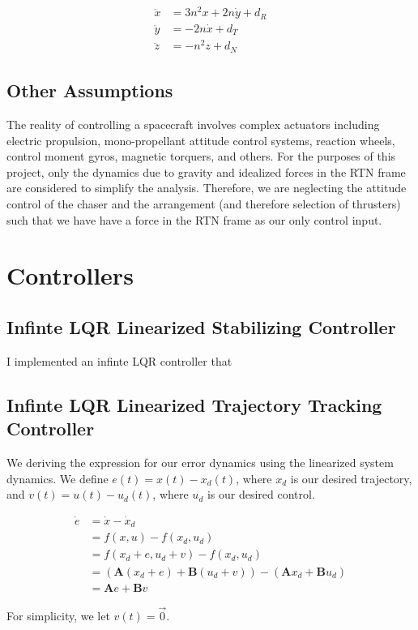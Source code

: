 \documentclass[12pt, letterpaper,titlepage]{article}
\def\bf{\mathbf}
\begin{document}
\begin{equation}
    \label{linear_dynamics}
    \begin{split}
        \ddot{x} & = 3n^2 x + 2n\dot{y}  + d_R \\
        \ddot{y} & = -2n\dot{x} + d_T \\
        \ddot{z} & = -n^2z + d_N
    \end{split}
\end{equation}

\subsection{Other Assumptions}

The reality of controlling a spacecraft involves complex actuators including
electric propulsion, mono-propellant attitude control systems, reaction wheels,
control moment gyros, magnetic torquers, and others. For the purposes of this
project, only the dynamics due to gravity and idealized forces in the RTN frame
are considered to simplify the analysis. Therefore, we are neglecting the
attitude control of the chaser and the arrangement (and therefore selection of
thrusters) such that we have have a force in the RTN frame as our only control
input.

\section{Controllers}

\subsection{Infinte LQR Linearized Stabilizing Controller}

I implemented an infinte LQR controller that 

\subsection{Infinte LQR Linearized Trajectory Tracking Controller}

We deriving the expression for our error dynamics using the linearized system
dynamics. We define $e(t) = x(t) - x_d(t)$, where $x_d$ is our desired
trajectory, and $v(t) = u(t) - u_d(t)$, where $u_d$ is our desired control.

\begin{equation}
    \label{linearized_error_dynamics}
    \begin{split}
        \dot{e} & = \dot{x} - \dot{x}_d \\
                & = f(x, u) - f(x_d, u_d) \\
                & = f(x_d + e, u_d + v) - f(x_d, u_d) \\
                & = (\bf{A}(x_d + e) + \bf{B}(u_d + v)) - (\bf{A}x_d +
                    \bf{B}u_d) \\
                & = \bf{A}e + \bf{B}v
    \end{split}
\end{equation}

For simplicity, we let $v(t) = \vec{0}.$



\end{document}
